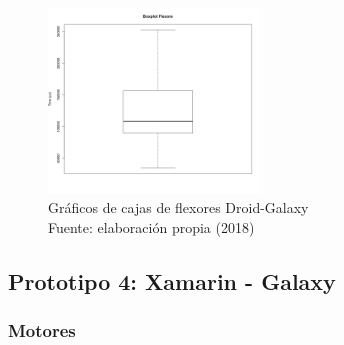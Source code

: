 \begin{figure}[H]
  \begin{center} 
   	\includegraphics[width=0.5\textwidth]{evaluation/graphics/Droid/Galaxy/BoxplotFlexorsDroidGalaxy.png} 
    \caption[Gráficos de cajas de flexores Droid-Galaxy]{Gráficos de cajas de flexores Droid-Galaxy\\Fuente: elaboración propia (2018)} 
    \label{fig:droid-galaxy-boxplot-flexors}
  \end{center}
\end{figure}





\subsection{Prototipo 4: Xamarin - Galaxy}

\subsubsection{Motores}

